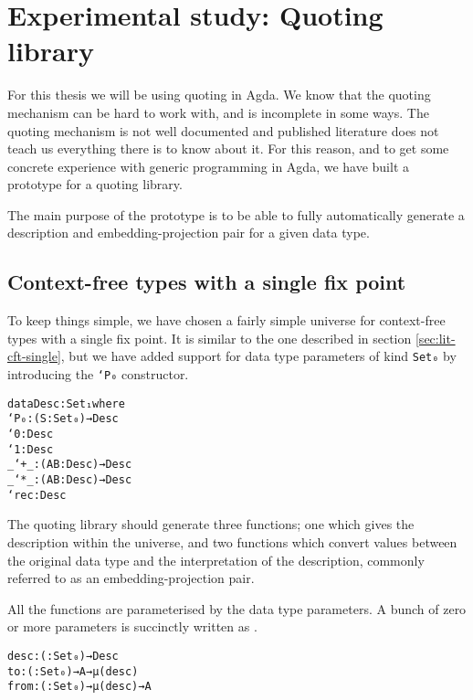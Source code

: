 \section{Experimental study: Quoting library}\label{sec:prototype}

For this thesis we will be using quoting in Agda.
We know that the quoting mechanism can be hard to work with, and is
incomplete in some ways.
The quoting mechanism is not well documented and published literature
does not teach us everything there is to know about it.
For this reason, and to get some concrete experience with generic
programming in Agda, we have built a prototype for a quoting library.

The main purpose of the prototype is to be able to fully automatically
generate a description and embedding-projection pair for a given data
type.

\subsection{Context-free types with a single fix point}

To keep things simple, we have chosen a fairly simple universe for
context-free types with a single fix
point.
It is similar to the one described in section
\ref{sec:lit-cft-single}, but we have added support for data type
parameters of kind \texttt{Set₀} by introducing the \texttt{`P₀}
constructor.

\begin{alltt}
data Desc : Set₁ where
  `P₀ : (S : Set₀) → Desc
  `0 : Desc
  `1 : Desc
  _`+_ : (A B : Desc) → Desc
  _`*_ : (A B : Desc) → Desc
  `rec : Desc
\end{alltt}

The quoting library should generate three functions; one which gives
the description within the universe, and two functions which convert
values between the original data type and the interpretation of the
description, commonly referred to as an embedding-projection pair.

All the functions are parameterised by the data type parameters.
A bunch of zero or more parameters is succinctly written as
\texttt{}.

\begin{alltt}
desc : ( : Set₀) → Desc
to : ( : Set₀) → A → μ (desc )
from : ( : Set₀) → μ (desc ) → A
\end{alltt}

